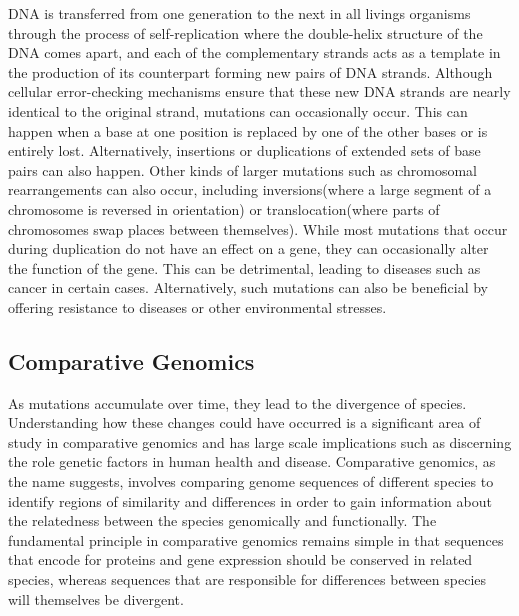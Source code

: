 DNA is transferred from one generation to the next in all livings organisms through the process of self-replication where the double-helix structure of the DNA comes apart, and each of the complementary strands acts as a template in the production of its counterpart forming new pairs of DNA strands\cite{pray2008semi}. Although cellular error-checking mechanisms ensure that these new DNA strands are nearly identical to the original strand, mutations can occasionally occur. This can happen when a base at one position is replaced by one of the other bases or is entirely lost. Alternatively, insertions or duplications of extended sets of base pairs can also happen. Other kinds of larger mutations such as chromosomal rearrangements can also occur, including inversions(where a large segment of a chromosome is reversed in orientation) or translocation(where parts of chromosomes swap places between themselves)\cite{hartwell2008genetics}. While most mutations that occur during duplication do not have an effect on a gene, they can occasionally alter the function of the gene. This can be detrimental, leading to diseases such as cancer in certain cases. Alternatively, such mutations can also be beneficial by offering resistance to diseases or other environmental stresses. 

\subsection{Comparative Genomics}\label{comparegenomics}

As mutations accumulate over time, they lead to the divergence of species. Understanding how these changes could have occurred is a significant area of study in comparative genomics and has large scale implications such as discerning the role genetic factors in human health and disease\cite{collins2003vision}. Comparative genomics, as the name suggests, involves comparing genome sequences of different species to identify regions of similarity and differences in order to gain information about the relatedness between the species genomically and functionally. The fundamental principle in comparative genomics remains simple in that sequences that encode for proteins and gene expression should be conserved in related species, whereas sequences that are responsible for differences between species will themselves be divergent\cite{hardison2003comparative}.

